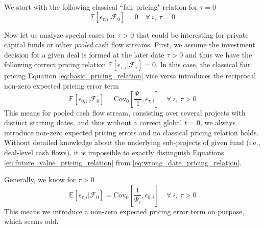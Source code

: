 \documentclass[12pt]{article}
\begin{document}
\iffalse


We start with the following classical ``fair pricing" relation for $\tau = 0$
\begin{equation}
	\label{eq:basic_pricing_relation}
	\mathbb{E} \left[ 
	\epsilon_{\tau,i}
	\left| \mathcal{F}_{0} \right.
	\right] = 0
	\quad \forall \ i, \ \tau = 0
\end{equation}

Now let us analyze special cases for $\tau > 0$ that could be interesting for private capital funds or other \emph{pooled} cash flow streams.
First, we assume the investment decision for a given deal is formed at the later date $\tau > 0$ and thus we have the following correct pricing relation $\mathbb{E} \left[ \epsilon_{\tau,i} \left| \mathcal{F}_{\tau} \right. \right] = 0$.
In this case, the classical fair pricing Equation \ref{eq:basic_pricing_relation} vice versa introduces the reciprocal non-zero expected pricing error term 
\begin{equation}
	\label{eq:wrong_date_pricing_relation}
	\mathbb{E} \left[ 
	\epsilon_{0,i}
	\left| \mathcal{F}_{0} \right.
	\right] = 
	\mathrm{Cov}_{0} \left[ \frac{\Psi_{\tau}}{1}, \epsilon_{\tau,i} \right]
	\quad \forall \ i, \ \tau > 0
\end{equation}
This means for pooled cash flow stream, consisting over several projects with distinct starting dates, and thus without a correct global $t=0$, we always introduce  non-zero expected pricing errors and no classical pricing relation holds.
Without detailed knowledge about the underlying sub-projects of given fund (i.e., deal-level cash flows), it is impossible to exactly distinguish Equations \ref{eq:future_value_pricing_relation} from \ref{eq:wrong_date_pricing_relation}.

Generally, we know for $\tau > 0$
\begin{equation}
	\label{eq:future_value_pricing_relation}
	\mathbb{E} \left[ 
	\epsilon_{\tau,i}
	\left| \mathcal{F}_{0} \right.
	\right] = 
	\mathrm{Cov}_0 \left[ \frac{1}{\Psi_{\tau}}, \epsilon_{0,i} \right]
	\quad \forall \ i, \ \tau > 0
\end{equation}
This means we introduce a non-zero expected pricing error term on purpose, which seems odd.
\end{document}
